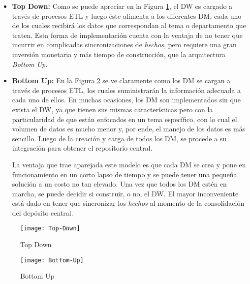 \documentclass[a4paper,11pt]{article}
\begin{document}
    \begin{itemize}
      \item \textbf{Top Down:} Como se puede apreciar en la Figura \ref{top_down}, el DW es cargado a través de procesos ETL y luego éste alimenta a los
      diferentes DM, cada uno de los cuales recibirá los datos que correspondan al tema o departamento que traten. Esta forma de implementación cuenta
      con la ventaja de no tener que incurrir en complicadas sincronizaciones de \textit{hechos}, pero requiere una gran inversión monetaria y más tiempo de
      construcción, que la arquitectura \textit{Bottom Up}.
      \item \textbf{Bottom Up:} En la Figura \ref{bottom_up} se ve claramente como los DM se cargan a través de procesos ETL, los cuales suministrarán la
      información adecuada a cada uno de ellos. En muchas ocasiones, los DM son implementados sin que exista el DW, ya que tienen sus mismas 
      características pero con la particularidad de que están enfocados en un tema específico, con lo cual el volumen de datos es mucho menor y, por ende,
      el manejo de los datos es más sencillo. Luego de la creación y carga de todos los DM, se procede a su integración para obtener el
      repositorio central.
      
      La ventaja que trae aparejada este modelo es que cada DM se crea y pone en funcionamiento en un corto lapso de tiempo y se
      puede tener una pequeña solución a un costo no tan elevado. Una vez que todos los DM estén en marcha, se puede decidir si construir, o no, el DW.
      El mayor inconveniente está dado en tener que sincronizar los \textit{hechos} al momento de la consolidación del depósito central.
    \end{itemize}
    
    \begin{figure}
      \begin{center}
        \texttt{[image: Top-Down]}
        \caption{Top Down} \cite[p.~74]{hefestov2}
        \label{top_down}
      \end{center}
    \end{figure}
    
    \begin{figure}
      \begin{center}
        \texttt{[image: Bottom-Up]}
        \caption{Bottom Up} \cite[p.~74]{hefestov2}
        \label{bottom_up}
      \end{center}
    \end{figure}
    
\end{document}
